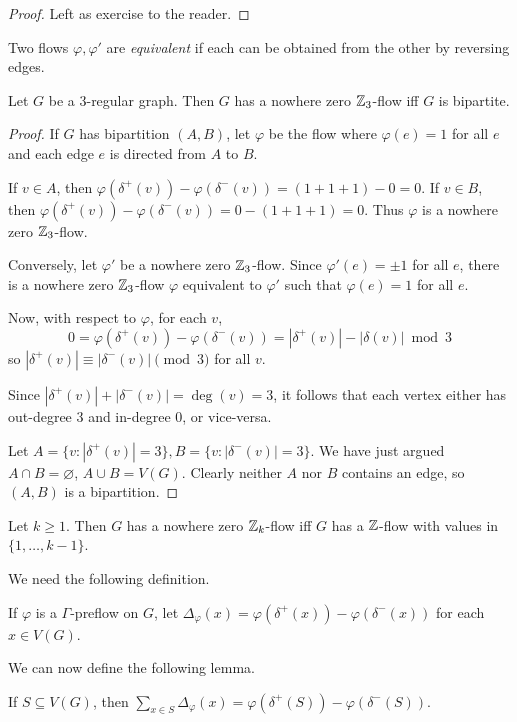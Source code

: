 \documentclass[main.tex]{subfiles}
\begin{document}
\begin{proof}
  Left as exercise to the reader.
\end{proof}
Two flows $\varphi, \varphi'$ are \textit{equivalent} if each can be obtained
from the other by reversing edges.
\begin{proposition*}
  Let $G$ be a 3-regular graph.
  Then $G$ has a nowhere zero $\mathbb Z_3$-flow iff $G$ is bipartite.
\end{proposition*}
\begin{proof}
  If $G$ has bipartition $(A,B)$, let $\varphi$ be the flow where
  $\varphi(e) = 1$ for all $e$ and each edge $e$ is directed from $A$ to $B$.

  If $v\in A$, then $\varphi(\delta^+(v)) - \varphi(\delta^-(v)) = (1 + 1 + 1) - 0 = 0$.
  If $v\in B$, then $\varphi(\delta^+(v)) - \varphi(\delta^-(v)) = 0 - (1+1+1) = 0$.
  Thus $\varphi$ is a nowhere zero $\mathbb Z_3$-flow.

  Conversely, let $\varphi'$ be a nowhere zero $\mathbb Z_3$-flow.
  Since $\varphi'(e) = \pm 1$ for all $e$, there is a nowhere zero $\mathbb Z_3$-flow
  $\varphi$ equivalent to $\varphi'$ such that $\varphi(e) = 1$ for all $e$.

  Now, with respect to $\varphi$, for each $v$,
  \[
    0 = \varphi(\delta^+(v)) - \varphi(\delta^-(v)) = |\delta^+(v)| - |\delta(v)|\bmod 3
  \]
  so $|\delta^+(v)|\equiv|\delta^-(v)|\pmod 3$ for all $v$.

  Since $|\delta^+(v)| + |\delta^-(v)| = \deg(v) = 3$, it follows that each
  vertex either has out-degree 3 and in-degree 0, or vice-versa.

  Let $A = \{v : |\delta^+(v)| = 3\}, B = \{v : |\delta^-(v)| = 3\}$.
  We have just argued $A\cap B = \varnothing$, $A\cup B = V(G)$.
  Clearly neither $A$ nor $B$ contains an edge, so $(A,B)$ is a bipartition.
\end{proof}
\begin{theorem}[Tutte]
  \th\label{thm:tutte-nwz-Zk-implies-nwz-Z}
  Let $k\geq 1$.
  Then $G$ has a nowhere zero $\mathbb Z_k$-flow iff $G$ has a $\mathbb Z$-flow with values
  in $\{1,\ldots,k-1\}$.
\end{theorem}
We need the following definition.
\begin{definition*}
  If $\varphi$ is a $\Gamma$-preflow on $G$, let
  $\Delta_\varphi(x) = \varphi(\delta^+(x)) - \varphi(\delta^-(x))$
  for each $x\in V(G)$.
\end{definition*}
We can now define the following lemma.
\begin{lemma}
  If $S\subseteq V(G)$, then
  $\sum_{x\in S}\Delta_\varphi(x) = \varphi(\delta^+(S)) - \varphi(\delta^-(S))$.
\end{lemma}
\end{document}
